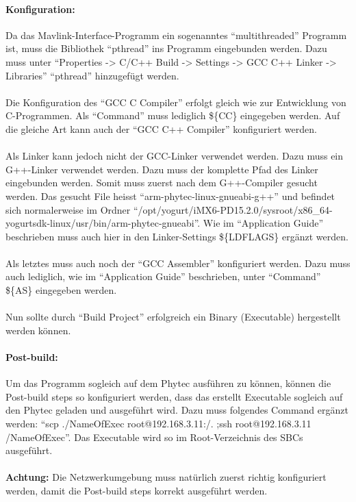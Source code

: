 \documentclass[12pt]{article} %
\begin{document}
	\paragraph*{Konfiguration:}
	Da das Mavlink-Interface-Programm ein sogenanntes "`multithreaded"' Programm ist, muss die Bibliothek "`pthread"' ins Programm eingebunden werden. Dazu muss unter "`Properties -> C/C++ Build -> Settings -> GCC C++ Linker -> Libraries"' "`pthread"' hinzugefügt werden.\\
	\\
	Die Konfiguration des "`GCC C Compiler"' erfolgt gleich wie zur Entwicklung von C-Programmen. Als "`Command"' muss lediglich \$\{CC\} eingegeben werden. Auf die gleiche Art kann auch der "`GCC C++ Compiler"' konfiguriert werden.\\
	\\
	Als Linker kann jedoch nicht der GCC-Linker verwendet werden. Dazu muss ein G++-Linker verwendet werden. Dazu muss der komplette Pfad des Linker eingebunden werden. Somit muss zuerst nach dem G++-Compiler gesucht werden. Das gesucht File heisst "`arm-phytec-linux-gnueabi-g++"' und befindet sich normalerweise im Ordner "`/opt/yogurt/iMX6-PD15.2.0/sysroot/x86\_64-yogurtsdk-linux/usr/bin/arm-phytec-gnueabi"'. Wie im "`Application Guide"' beschrieben muss auch hier in den Linker-Settings \$\{LDFLAGS\} ergänzt werden.\\
	\\
	Als letztes muss auch noch der "`GCC Assembler"' konfiguriert werden. Dazu muss auch lediglich, wie im "`Application Guide"' beschrieben, unter "`Command"' \$\{AS\} eingegeben werden.\\
	\\
	Nun sollte durch "`Build Project"' erfolgreich ein Binary (Executable) hergestellt werden können.
	
	\paragraph{Post-build:}
	Um das Programm sogleich auf dem Phytec ausführen zu können, können die Post-build steps so konfiguriert werden, dass das erstellt Executable sogleich auf den Phytec geladen und ausgeführt wird. Dazu muss folgendes Command ergänzt werden: "`scp ./NameOfExec root@192.168.3.11:/. ;ssh root@192.168.3.11 /NameOfExec"'. Das Executable wird so im Root-Verzeichnis des SBCs ausgeführt.\\
	\\
	\textbf{Achtung:} Die Netzwerkumgebung muss natürlich zuerst richtig konfiguriert werden, damit die Post-build steps korrekt ausgeführt werden.
	
\end{document}
